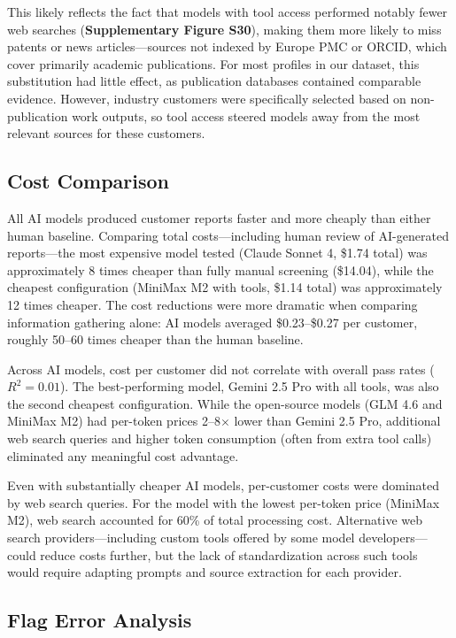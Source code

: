 \documentclass[utf8]{FrontiersinHarvard}
\begin{document}
This likely reflects the fact that models with tool access performed notably fewer web searches (\textbf{Supplementary Figure S30}), making them more likely to miss patents or news articles---sources not indexed by Europe PMC or ORCID, which cover primarily academic publications. For most profiles in our dataset, this substitution had little effect, as publication databases contained comparable evidence. However, industry customers were specifically selected based on non-publication work outputs, so tool access steered models away from the most relevant sources for these customers.

\subsection{Cost Comparison}

All AI models produced customer reports faster and more cheaply than either human baseline. Comparing total costs---including human review of AI-generated reports---the most expensive model tested (Claude Sonnet 4, \$1.74 total) was approximately 8 times cheaper than fully manual screening (\$14.04), while the cheapest configuration (MiniMax M2 with tools, \$1.14 total) was approximately 12 times cheaper. The cost reductions were more dramatic when comparing information gathering alone: AI models averaged \$0.23--\$0.27 per customer, roughly 50--60 times cheaper than the human baseline.

Across AI models, cost per customer did not correlate with overall pass rates ($R^2 = 0.01$). The best-performing model, Gemini 2.5 Pro with all tools, was also the second cheapest configuration. While the open-source models (GLM 4.6 and MiniMax M2) had per-token prices 2--8$\times$ lower than Gemini 2.5 Pro, additional web search queries and higher token consumption (often from extra tool calls) eliminated any meaningful cost advantage.

Even with substantially cheaper AI models, per-customer costs were dominated by web search queries. For the model with the lowest per-token price (MiniMax M2), web search accounted for 60\% of total processing cost. Alternative web search providers---including custom tools offered by some model developers---could reduce costs further, but the lack of standardization across such tools would require adapting prompts and source extraction for each provider.

\subsection{Flag Error Analysis}
\end{document}
